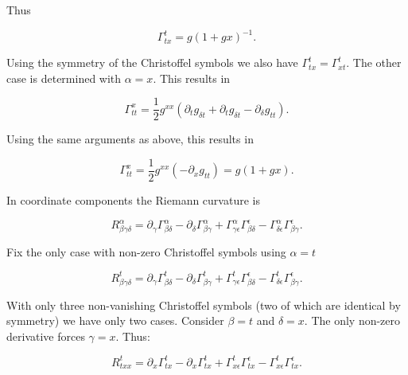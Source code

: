 \documentclass[11pt]{article}
\begin{document}
Thus

\begin{equation}
    \label{christ-awful-t-3}
    \Gamma^{t}_{t x} = g (1 + gx)^{-1}.
\end{equation}

Using the symmetry of the Christoffel symbols we also have $\Gamma^{t}_{t x} = \Gamma^{t}_{x t}$. The other case is determined with $\alpha = x$. This results in

\begin{equation}
    \label{christ-awful-x}
    \Gamma^{x}_{t t} = \frac{1}{2} g^{x x} \left( \partial_{t} g_{\delta t} + \partial_{t} g_{\delta t} - \partial_{\delta} g_{t t}\right).
\end{equation}

Using the same arguments as above, this results in

\begin{equation}
    \label{christ-awful-x-1}
    \Gamma^{x}_{t t} = \frac{1}{2} g^{x x} \left( - \partial_{x} g_{t t}\right) = g(1 + gx).
\end{equation}

In coordinate components the Riemann curvature is

\begin{equation}
    \label{Riemmann-curv-formula}
    R^{\alpha} _{\beta \gamma \delta} = \partial_{\gamma} \Gamma^{\alpha}_{\beta \delta} - \partial_{\delta} \Gamma^{\alpha}_{\beta \gamma} + \Gamma^{\alpha}_{\gamma \epsilon} \Gamma^{\epsilon}_{\beta \delta} - \Gamma^{\alpha}_{\delta \epsilon} \Gamma^{\epsilon}_{\beta \gamma}.
\end{equation}

Fix the only case with non-zero Christoffel symbols using $\alpha = t$

\begin{equation}
    \label{Riemmann-curv-formula-t-x}
    R^{t} _{\beta \gamma \delta} = \partial_{\gamma} \Gamma^{t}_{\beta \delta} - \partial_{\delta} \Gamma^{t}_{\beta \gamma} + \Gamma^{t}_{\gamma \epsilon} \Gamma^{\epsilon}_{\beta \delta} - \Gamma^{t}_{\delta \epsilon} \Gamma^{\epsilon}_{\beta \gamma}.
\end{equation}

With only three non-vanishing Christoffel symbols (two of which are identical by symmetry) we have only two cases. Consider $\beta = t$ and $\delta = x$. The only non-zero derivative forces $\gamma = x$. Thus:

\begin{equation}
    \label{Riemmann-curv-formula-t-x}
    R^{t} _{t x x} = \partial_{x} \Gamma^{t}_{t x} - \partial_{x} \Gamma^{t}_{t x} + \Gamma^{t}_{x \epsilon} \Gamma^{\epsilon}_{t x} - \Gamma^{t}_{x \epsilon} \Gamma^{\epsilon}_{t x}.
\end{equation}
\end{document}

